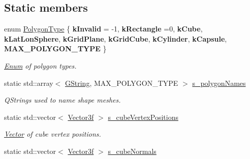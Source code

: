 \subsection*{Static members}
\begin{DoxyCompactItemize}
\item 
\mbox{\label{classrev_1_1_polygon_cache_a08f12f93c70a2b00886877090312d106}} 
enum \mbox{\hyperlink{classrev_1_1_polygon_cache_a08f12f93c70a2b00886877090312d106}{Polygon\+Type}} \{ \newline
{\bfseries k\+Invalid} = -\/1, 
{\bfseries k\+Rectangle} =0, 
{\bfseries k\+Cube}, 
{\bfseries k\+Lat\+Lon\+Sphere}, 
\newline
{\bfseries k\+Grid\+Plane}, 
{\bfseries k\+Grid\+Cube}, 
{\bfseries k\+Cylinder}, 
{\bfseries k\+Capsule}, 
\newline
{\bfseries M\+A\+X\+\_\+\+P\+O\+L\+Y\+G\+O\+N\+\_\+\+T\+Y\+PE}
 \}
\begin{DoxyCompactList}\small\item\em \mbox{\hyperlink{struct_enum}{Enum}} of polygon types. \end{DoxyCompactList}\item 
static std\+::array$<$ \mbox{\hyperlink{classrev_1_1_g_string}{G\+String}}, M\+A\+X\+\_\+\+P\+O\+L\+Y\+G\+O\+N\+\_\+\+T\+Y\+PE $>$ \mbox{\hyperlink{classrev_1_1_polygon_cache_a2891b8387ccc7a99bd9bf0e5c079d6cc}{s\+\_\+polygon\+Names}}
\begin{DoxyCompactList}\small\item\em Q\+Strings used to name shape meshes. \end{DoxyCompactList}\item 
\mbox{\label{classrev_1_1_polygon_cache_abaffcb347a79d3efa1f0ce0cacbe9f75}} 
static std\+::vector$<$ \mbox{\hyperlink{classrev_1_1_vector}{Vector3f}} $>$ \mbox{\hyperlink{classrev_1_1_polygon_cache_abaffcb347a79d3efa1f0ce0cacbe9f75}{s\+\_\+cube\+Vertex\+Positions}}
\begin{DoxyCompactList}\small\item\em \mbox{\hyperlink{classrev_1_1_vector}{Vector}} of cube vertex positions. \end{DoxyCompactList}\item 
\mbox{\label{classrev_1_1_polygon_cache_ac44e389dd8d3a4db92f02ab8444307fa}} 
static std\+::vector$<$ \mbox{\hyperlink{classrev_1_1_vector}{Vector3f}} $>$ \mbox{\hyperlink{classrev_1_1_polygon_cache_ac44e389dd8d3a4db92f02ab8444307fa}{s\+\_\+cube\+Normals}}

\end{DoxyCompactItemize}
